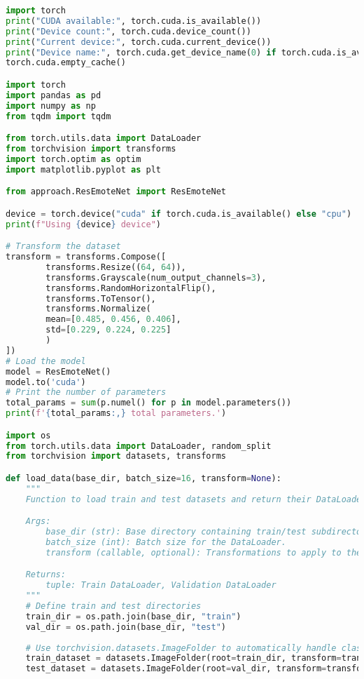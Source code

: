 \begin{lstlisting}[language=Python, caption={Python skript použitý na trenovanie modelu}, label={lst:emotion-recognition}]
% Obsah Jupyter notebooku
import torch
print("CUDA available:", torch.cuda.is_available())
print("Device count:", torch.cuda.device_count())
print("Current device:", torch.cuda.current_device())
print("Device name:", torch.cuda.get_device_name(0) if torch.cuda.is_available() else "None")
torch.cuda.empty_cache()

import torch
import pandas as pd
import numpy as np
from tqdm import tqdm

from torch.utils.data import DataLoader
from torchvision import transforms
import torch.optim as optim
import matplotlib.pyplot as plt

from approach.ResEmoteNet import ResEmoteNet

device = torch.device("cuda" if torch.cuda.is_available() else "cpu")
print(f"Using {device} device")

# Transform the dataset
transform = transforms.Compose([
        transforms.Resize((64, 64)),
        transforms.Grayscale(num_output_channels=3),
        transforms.RandomHorizontalFlip(),
        transforms.ToTensor(),
        transforms.Normalize(
        mean=[0.485, 0.456, 0.406],
        std=[0.229, 0.224, 0.225]
        )
])
# Load the model
model = ResEmoteNet()
model.to('cuda')
# Print the number of parameters
total_params = sum(p.numel() for p in model.parameters())
print(f'{total_params:,} total parameters.')

import os
from torch.utils.data import DataLoader, random_split
from torchvision import datasets, transforms

def load_data(base_dir, batch_size=16, transform=None):
    """
    Function to load train and test datasets and return their DataLoaders.

    Args:
        base_dir (str): Base directory containing train/test subdirectories.
        batch_size (int): Batch size for the DataLoader.
        transform (callable, optional): Transformations to apply to the images.

    Returns:
        tuple: Train DataLoader, Validation DataLoader
    """
    # Define train and test directories
    train_dir = os.path.join(base_dir, "train")
    val_dir = os.path.join(base_dir, "test")
    
    # Use torchvision.datasets.ImageFolder to automatically handle class folders
    train_dataset = datasets.ImageFolder(root=train_dir, transform=transform)
    test_dataset = datasets.ImageFolder(root=val_dir, transform=transform)
    

\end{lstlisting}
